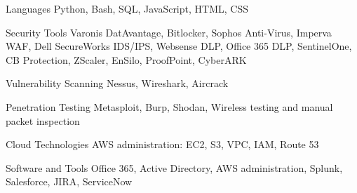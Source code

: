 
\begin{cvskills}
  \cvskill
    {Languages} %
    {Python, Bash, SQL, JavaScript, HTML, CSS} %

  \cvskill
    {Security Tools} %
    {Varonis DatAvantage, Bitlocker, Sophos Anti-Virus, Imperva WAF, Dell SecureWorks IDS/IPS,\newline
     Websense DLP, Office 365 DLP, SentinelOne, CB Protection, ZScaler, EnSilo, ProofPoint, CyberARK} %

  \cvskill
    {Vulnerability Scanning} %
    {Nessus, Wireshark, Aircrack} %

  \cvskill
    {Penetration Testing} %
    {Metasploit, Burp, Shodan, Wireless testing and manual packet inspection} %

  \cvskill
    {Cloud Technologies} %
    {AWS administration: EC2, S3, VPC, IAM, Route 53} %

  \cvskill
    {Software and Tools} %
    {Office 365, Active Directory, AWS administration, Splunk, Salesforce, JIRA, ServiceNow} %

\end{cvskills}

